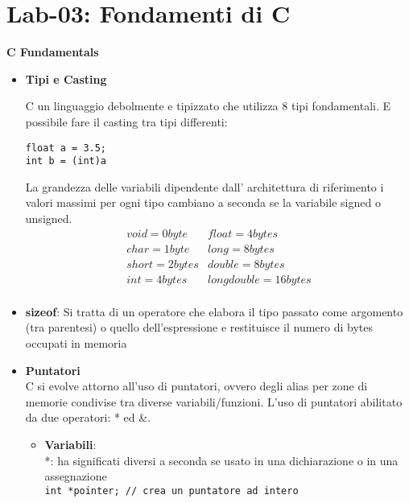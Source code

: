 \section{Lab-03: Fondamenti di C}
\begin{flushleft}
  \textbf{C Fundamentals}\par 
  \begin{itemize}
    \item \textbf{Tipi e Casting}\par 
          C \ace un linguaggio debolmente e tipizzato che utilizza 8 tipi 
          fondamentali. \ac{E} possibile fare il casting tra tipi 
          differenti: 
          \begin{flushleft}
            \texttt{float a = 3.5; \\
                    int b = (int)a}
          \end{flushleft}
          La grandezza delle variabili \ace dipendente dall'
          architettura di riferimento i valori massimi per ogni 
          tipo cambiano a seconda se la variabile \ace signed o unsigned.
          $$\begin{array}{l|l}
            void = 0 byte & float = 4 bytes \\
            char = 1 byte & long = 8 bytes\\
            short = 2 bytes & double = 8 bytes \\
            int = 4 bytes & long double = 16 bytes \\
          \end{array}$$
    \item \textbf{sizeof}: Si tratta di un operatore che elabora il tipo passato come argomento (tra parentesi) o 
    quello dell’espressione e restituisce il numero di bytes occupati in memoria
    \item \textbf{Puntatori}\\
          C si evolve attorno all'uso di puntatori, ovvero degli 
          alias per zone di memorie condivise tra diverse 
          variabili/funzioni. L'uso di puntatori \ace abilitato da 
          due operatori: * ed \&.
          \begin{itemize}
            \item \textbf{Variabili}:\\
                  *: ha significati diversi a seconda se usato in una dichiarazione 
                  o in una assegnazione\\
                  \texttt{int *pointer; // crea un puntatore ad intero \\
}
\end{itemize}
\end{itemize}
\end{flushleft}
